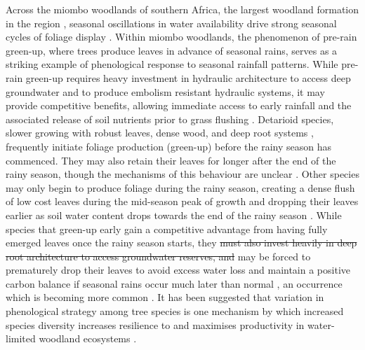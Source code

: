 \documentclass[11pt,a4paper]{article}
\providecommand{\DIFdeltex}[1]{{\protect\color{red}\sout{#1}}}                      %
\providecommand{\DIFdelbegin}{} %
\providecommand{\DIFdelend}{} %
\providecommand{\DIFdel}[1]{\texorpdfstring{\DIFdeltex{#1}}{}} %
\newcommand{\DIFscaledelfig}{0.5}
\newlength{\DIFdelgraphicswidth} %
\newlength{\DIFdelgraphicsheight} %
\newcommand{\DIFdelincludegraphics}[2][]{%
\sbox{\DIFdelgraphicsbox}{\DIFOincludegraphics[#1]{#2}}%
\settoboxwidth{\DIFdelgraphicswidth}{\DIFdelgraphicsbox} %
\settoboxtotalheight{\DIFdelgraphicsheight}{\DIFdelgraphicsbox} %
\scalebox{\DIFscaledelfig}{%
\parbox[b]{\DIFdelgraphicswidth}{\usebox{\DIFdelgraphicsbox}\\[-\baselineskip] \rule{\DIFdelgraphicswidth}{0em}}\llap{\resizebox{\DIFdelgraphicswidth}{\DIFdelgraphicsheight}{%
\setlength{\unitlength}{\DIFdelgraphicswidth}%
\begin{picture}(1,1)%
\thicklines\linethickness{2pt} %
{\color[rgb]{1,0,0}\put(0,0){\framebox(1,1){}}}%
{\color[rgb]{1,0,0}\put(0,0){\line( 1,1){1}}}%
{\color[rgb]{1,0,0}\put(0,1){\line(1,-1){1}}}%
\end{picture}%
}\hspace*{3pt}}} %
} %
\DeclareRobustCommand{\DIFdelbegin}{\DIFOdelbegin \let\includegraphics\DIFdelincludegraphics} %
\DeclareRobustCommand{\DIFdelend}{\DIFOaddend \let\includegraphics\DIFOincludegraphics} %
\begin{document}
Across the miombo woodlands of southern Africa, the largest woodland formation
in the region \citep{White1983}, seasonal oscillations in water availability
drive strong seasonal cycles of foliage display \citep{Chidumayo2001,
Dahlin2016}. Within miombo woodlands, the phenomenon of pre-rain green-up,
where trees produce leaves in advance of seasonal rains, serves as a striking
example of phenological response to seasonal rainfall patterns. While pre-rain
green-up requires heavy investment in hydraulic architecture to access deep
groundwater and to produce embolism resistant hydraulic systems, it may provide
competitive benefits, allowing immediate access to early rainfall and the
associated release of soil nutrients prior to grass flushing \citep{Ryan2017,
February2016}. Detarioid species, slower growing with robust leaves, dense
wood, and deep root systems \citep{Zhou2020, Timberlake1993}, frequently
initiate foliage production (green-up) before the rainy season has commenced.
They may also retain their leaves for longer after the end of the rainy season,
though the mechanisms of this behaviour are unclear \citep{Giraldo2011,
Kushwaha2011}. Other species may only begin to produce foliage during the rainy
season, creating a dense flush of low cost leaves during the mid-season peak of
growth and dropping their leaves earlier as soil water content drops towards
the end of the rainy season \citep{Lasky2016}. While species that green-up
early gain a competitive advantage from having fully emerged leaves once the
rainy season starts, they \DIFdelbegin \DIFdel{must also invest heavily in deep root architecture to
access groundwater reserves, and }\DIFdelend may be forced to prematurely drop their leaves to
avoid excess water loss and maintain a positive carbon balance if seasonal
rains occur much later than normal \citep{Vinya2018}, an occurrence which is
becoming more common \citep{Wainwright2021}. It has been suggested that
variation in phenological strategy among tree species is one mechanism by which
increased species diversity increases resilience to and maximises productivity
in water-limited woodland ecosystems \citep{Stan2019, Morellato2016}. 
\end{document}
